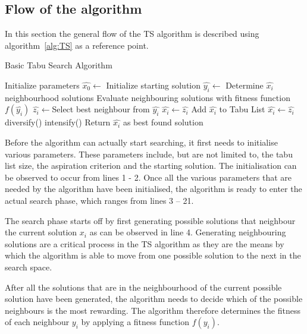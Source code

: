 \subsection{Flow of the algorithm}
In this section the general flow of the \gls{TS} algorithm is described using algorithm~\ref{alg:TS} as a reference point.
\begin{algorithm}[H]
\caption{Basic Tabu Search Algorithm\cite{TabuRCAProblem,TabuMontemanniSmith}}
\label{alg:TS}
	\begin{algorithmic}[1]
		\State Initialize parameters
    \State $\hat{x_0} \leftarrow$ Initialize starting solution
    \State $\hat{y_i} \leftarrow$ Determine $\hat{x_i}$ neighbourhood solutions 
    \State Evaluate neighbouring solutions with fitness function $f(\hat{y_i})$
    \State $\hat{z_i} \leftarrow$Select best neighbour from $\hat{y_i}$
    \State $\hat{x_i} \leftarrow \hat{z_i}$
				\EndIf
			\Else
      \State Add $\hat{x_i}$ to Tabu List
      \State $\hat{x_i} \leftarrow \hat{z_i}$
					\State diversify()
				\Else
					\State intensify()
				\EndIf
			\EndIf
		\EndWhile
    \State Return $\hat{x_i}$ as best found solution
	\end{algorithmic}
\end{algorithm}

Before the algorithm can actually start searching, it first needs to initialise various parameters. These parameters include, but are not limited to, the tabu list size, the aspiration criterion and the starting solution. The initialisation can be observed to occur from lines 1 - 2. Once all the various parameters that are needed by the algorithm have been initialised, the algorithm is ready to enter the actual search phase, which ranges from lines 3 -- 21. 

The search phase starts off by first generating possible solutions that neighbour the current solution $x_i$ as can be observed in line 4. Generating neighbouring solutions are a critical process in the \gls{TS} algorithm as they are the means by which the algorithm is able to move from one possible solution to the next in the search space.

After all the solutions that are in the neighbourhood of the current possible solution have been generated, the algorithm needs to decide which of the possible neighbours is the most rewarding. The algorithm therefore determines the fitness of each neighbour $y_i$ by applying a fitness function $f(y_i)$. 

